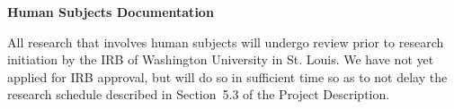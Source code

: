 \documentclass[11pt]{article}
\begin{document}
\pagestyle{plain}
\thispagestyle{plain}

\begin{center}
\textbf{\Large Human Subjects Documentation}
\end{center}

All research that involves human subjects will undergo review prior to
research initiation by the IRB of Washington University in St. Louis.
We have not yet applied for IRB approval, but will do so in sufficient
time so as to not delay the research schedule described in Section~5.3
of the Project Description.
\end{document}

